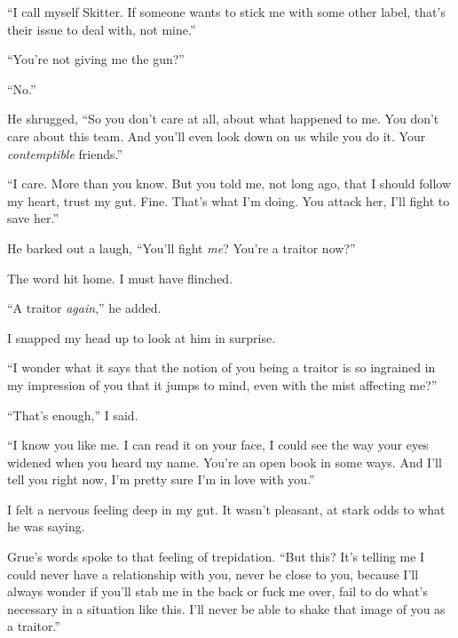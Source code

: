 ``I call myself Skitter.  If someone wants to stick me with some other label, that's their issue to deal with, not mine.''



``You're not giving me the gun?''



``No.''



He shrugged, ``So you don't care at all, about what happened to me.  You don't care about this team.  And you'll even look down on us while you do it.  Your \emph{contemptible }friends.''



``I care.  More than you know.  But you told me, not long ago, that I should follow my heart, trust my gut.  Fine.  That's what I'm doing.  You attack her, I'll fight to save her.''



He barked out a laugh, ``You'll fight \emph{me}?  You're a traitor now?''



The word hit home.  I must have flinched.



``A traitor \emph{again},'' he added.



I snapped my head up to look at him in surprise.



``I wonder what it says that the notion of you being a traitor is so ingrained in my impression of you that it jumps to mind, even with the mist affecting me?''



``That's enough,'' I said.



``I know you like me.  I can read it on your face, I could see the way your eyes widened when you heard my name.  You're an open book in some ways.  And I'll tell you right now, I'm pretty sure I'm in love with you.''



I felt a nervous feeling deep in my gut.  It wasn't pleasant, at stark odds to what he was saying.



Grue's words spoke to that feeling of trepidation.  ``But this?  It's telling me I could never have a relationship with you, never be close to you, because I'll always wonder if you'll stab me in the back or fuck me over, fail to do what's necessary in a situation like this.  I'll never be able to shake that image of you as a traitor.''



